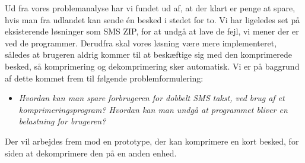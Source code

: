 Ud fra vores problemanalyse har vi fundet ud af, at der klart er penge at spare, hvis man fra udlandet kan sende én besked i stedet for to. Vi har ligeledes set på eksisterende løsninger som SMS ZIP, for at undgå at lave de fejl, vi mener der er ved de programmer. Derudfra skal vores løsning være mere implementeret, således at brugeren aldrig kommer til at beskæftige sig med den komprimerede besked, så komprimering og dekomprimering sker automatisk. Vi er på baggrund af dette kommet frem til følgende problemformulering:

\begin{itemize}
\item[] \emph{Hvordan kan man spare forbrugeren for dobbelt SMS takst, ved brug af et komprimeringsprogram? Hvordan kan man undgå at programmet bliver en belastning for brugeren?}
\end{itemize}

Der vil arbejdes frem mod en prototype, der kan komprimere en kort besked, for siden at dekomprimere den på en anden enhed. 